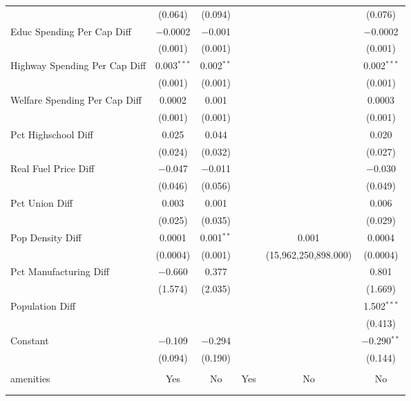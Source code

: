 \begin{table}[!htbp]
\begin{tabular}{@{\extracolsep{5pt}}lccccc}
  & (0.064) & (0.094) &  &  & (0.076) \\ 
  Educ Spending Per Cap Diff & $-$0.0002 & $-$0.001 &  &  & $-$0.0002 \\ 
  & (0.001) & (0.001) &  &  & (0.001) \\ 
  Highway Spending Per Cap Diff & 0.003$^{***}$ & 0.002$^{**}$ &  &  & 0.002$^{***}$ \\ 
  & (0.001) & (0.001) &  &  & (0.001) \\ 
  Welfare Spending Per Cap Diff & 0.0002 & 0.001 &  &  & 0.0003 \\ 
  & (0.001) & (0.001) &  &  & (0.001) \\ 
  Pct Highschool Diff & 0.025 & 0.044 &  &  & 0.020 \\ 
  & (0.024) & (0.032) &  &  & (0.027) \\ 
  Real Fuel Price Diff & $-$0.047 & $-$0.011 &  &  & $-$0.030 \\ 
  & (0.046) & (0.056) &  &  & (0.049) \\ 
  Pct Union Diff & 0.003 & 0.001 &  &  & 0.006 \\ 
  & (0.025) & (0.035) &  &  & (0.029) \\ 
  Pop Density Diff & 0.0001 & 0.001$^{**}$ &  & 0.001 & 0.0004 \\ 
  & (0.0004) & (0.001) &  & (15,962,250,898.000) & (0.0004) \\ 
  Pct Manufacturing Diff & $-$0.660 & 0.377 &  &  & 0.801 \\ 
  & (1.574) & (2.035) &  &  & (1.669) \\ 
  Population Diff &  &  &  &  & 1.502$^{***}$ \\ 
  &  &  &  &  & (0.413) \\ 
  Constant & $-$0.109 & $-$0.294 &  &  & $-$0.290$^{**}$ \\ 
  & (0.094) & (0.190) &  &  & (0.144) \\ 
 \hline \\[-1.8ex] 
amenities & Yes & No & Yes & No & No \\ 
\hline \\[-1.8ex] 
\hline 
\hline \\[-1.8ex] 
\end{tabular} 
\end{table} 
